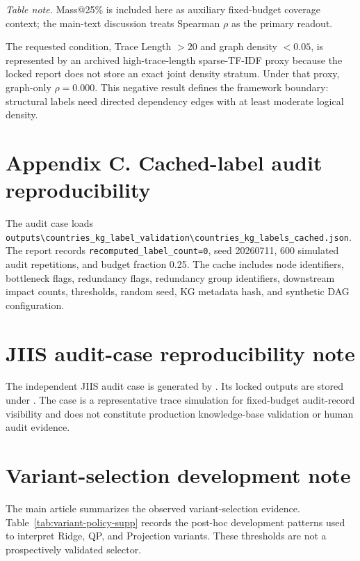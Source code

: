 \documentclass[pdflatex,sn-mathphys-num]{sn-jnl}
\begin{document}
\noindent\emph{Table note.} Mass@25\% is included here as auxiliary fixed-budget coverage context; the main-text discussion treats Spearman $\rho$ as the primary readout.

The requested condition, Trace Length $>20$ and graph density $<0.05$, is represented by an archived high-trace-length sparse-TF-IDF proxy because the locked report does not store an exact joint density stratum. Under that proxy, graph-only $\rho=0.000$. This negative result defines the framework boundary: structural labels need directed dependency edges with at least moderate logical density.

\section{Appendix C. Cached-label audit reproducibility}
\label{app:supp-cache-reproducibility}

The audit case loads \texttt{outputs\textbackslash{}countries\_kg\_label\_validation\textbackslash{}countries\_kg\_labels\_cached.json}. The report records \texttt{recomputed\_label\_count=0}, seed 20260711, 600 simulated audit repetitions, and budget fraction 0.25. The cache includes node identifiers, bottleneck flags, redundancy flags, redundancy group identifiers, downstream impact counts, thresholds, random seed, KG metadata hash, and synthetic DAG configuration.



\section{JIIS audit-case reproducibility note}
The independent JIIS audit case is generated by . Its locked outputs are stored under . The case is a representative trace simulation for fixed-budget audit-record visibility and does not constitute production knowledge-base validation or human audit evidence.

\section{Variant-selection development note}
The main article summarizes the observed variant-selection evidence. Table~\ref{tab:variant-policy-supp} records the post-hoc development patterns used to interpret Ridge, QP, and Projection variants. These thresholds are not a prospectively validated selector.
\end{document}
